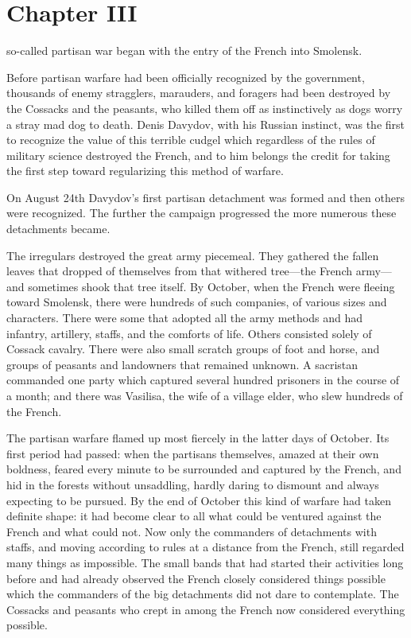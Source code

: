 \chapter*{Chapter III} \ifaudio {}
\fi

 so-called partisan war began with the entry of the French
into Smolensk.

Before partisan warfare had been officially recognized by the
government, thousands of enemy stragglers, marauders, and
foragers had been destroyed by the Cossacks and the peasants, who
killed them off as instinctively as dogs worry a stray mad dog to
death. Denis Davydov, with his Russian instinct, was the first to
recognize the value of this terrible cudgel which regardless of
the rules of military science destroyed the French, and to him
belongs the credit for taking the first step toward regularizing
this method of warfare.

On August 24th Davydov's first partisan detachment was formed and
then others were recognized. The further the campaign progressed
the more numerous these detachments became.

The irregulars destroyed the great army piecemeal. They gathered
the fallen leaves that dropped of themselves from that withered
tree---the French army---and sometimes shook that tree itself. By
October, when the French were fleeing toward Smolensk, there were
hundreds of such companies, of various sizes and
characters. There were some that adopted all the army methods and
had infantry, artillery, staffs, and the comforts of life. Others
consisted solely of Cossack cavalry. There were also small
scratch groups of foot and horse, and groups of peasants and
landowners that remained unknown. A sacristan commanded one party
which captured several hundred prisoners in the course of a
month; and there was Vasilisa, the wife of a village elder, who
slew hundreds of the French.

The partisan warfare flamed up most fiercely in the latter days
of October. Its first period had passed: when the partisans
themselves, amazed at their own boldness, feared every minute to
be surrounded and captured by the French, and hid in the forests
without unsaddling, hardly daring to dismount and always
expecting to be pursued. By the end of October this kind of
warfare had taken definite shape: it had become clear to all what
could be ventured against the French and what could not. Now only
the commanders of detachments with staffs, and moving according
to rules at a distance from the French, still regarded many
things as impossible. The small bands that had started their
activities long before and had already observed the French
closely considered things possible which the commanders of the
big detachments did not dare to contemplate. The Cossacks and
peasants who crept in among the French now considered everything
possible.

